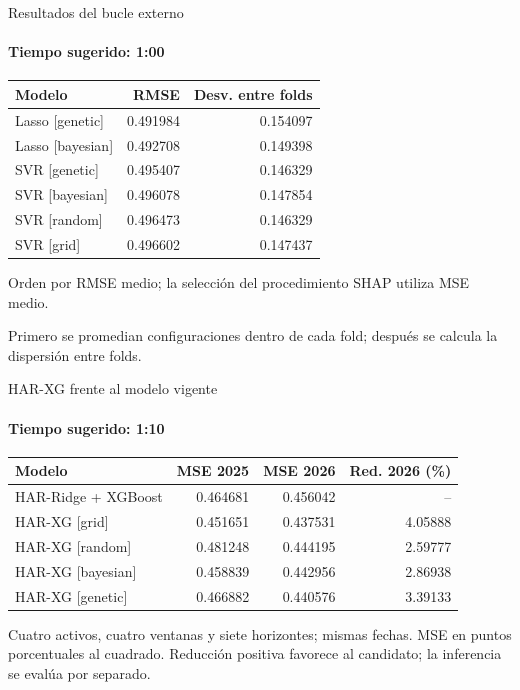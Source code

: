 \documentclass[aspectratio=169,10pt]{beamer}
\begin{document}
\begin{frame}{Resultados del bucle externo}
\framesubtitle{Tiempo sugerido: 1:00}
\small\begin{tabular}{p{6cm}rr}\toprule Modelo & RMSE & Desv. entre folds\\\midrule
Lasso [genetic] & 0.491984 & 0.154097\\
Lasso [bayesian] & 0.492708 & 0.149398\\
SVR [genetic] & 0.495407 & 0.146329\\
SVR [bayesian] & 0.496078 & 0.147854\\
SVR [random] & 0.496473 & 0.146329\\
SVR [grid] & 0.496602 & 0.147437\\\bottomrule\end{tabular}\par\medskip\footnotesize Orden por RMSE medio; la selección del procedimiento SHAP utiliza MSE medio.\par Primero se promedian configuraciones dentro de cada fold; después se calcula la dispersión entre folds.
\end{frame}
\begin{frame}{HAR-XG frente al modelo vigente}
\framesubtitle{Tiempo sugerido: 1:10}
\small\begin{tabular}{p{4.7cm}rrr}\toprule Modelo & MSE 2025 & MSE 2026 & Red. 2026 (\%)\\\midrule
HAR-Ridge + XGBoost & 0.464681 & 0.456042 & --\\
HAR-XG [grid] & 0.451651 & 0.437531 & 4.05888\\
HAR-XG [random] & 0.481248 & 0.444195 & 2.59777\\
HAR-XG [bayesian] & 0.458839 & 0.442956 & 2.86938\\
HAR-XG [genetic] & 0.466882 & 0.440576 & 3.39133\\
\bottomrule\end{tabular}\par\medskip\footnotesize Cuatro activos, cuatro ventanas y siete horizontes; mismas fechas. MSE en puntos porcentuales al cuadrado. Reducción positiva favorece al candidato; la inferencia se evalúa por separado.
\end{frame}
\end{document}
